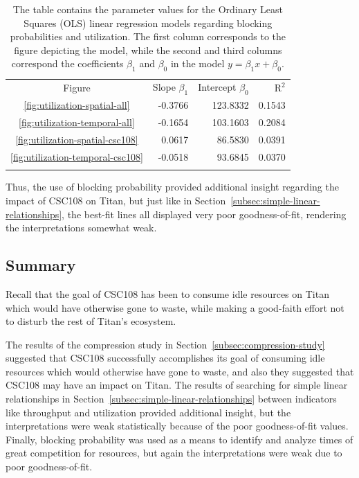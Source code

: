 \begin{table}
\caption{The table contains the parameter values for the Ordinary Least Squares
(OLS) linear regression models regarding blocking probabilities and utilization.
The first column corresponds to the figure depicting the model, while the
second and third columns correspond the coefficients $\beta_1$ and $\beta_0$ in
the model $y = \beta_{1}x + \beta_0$.}
\label{tab:blocking-utilization-params}       %
\begin{tabular}{crrr}
\hline\noalign{\smallskip}
Figure  & Slope $\beta_1$ & Intercept $\beta_0$     & $\text{R}^2$ \\
\noalign{\smallskip}\hline\noalign{\smallskip}
\ref{fig:utilization-spatial-all}       &   -0.3766 &   123.8332 & 0.1543 \\
\ref{fig:utilization-temporal-all}    &     -0.1654 &   103.1603 & 0.2084 \\
\ref{fig:utilization-spatial-csc108}  &      0.0617 &    86.5830 & 0.0391 \\
\ref{fig:utilization-temporal-csc108} &     -0.0518 &    93.6845 & 0.0370 \\
\noalign{\smallskip}\hline
\end{tabular}
\end{table}

Thus, the use of blocking probability provided additional insight regarding the
impact of CSC108 on Titan, but just like in
Section~\ref{subsec:simple-linear-relationships}, the best-fit lines all
displayed very poor goodness-of-fit, rendering the interpretations somewhat
weak.

\subsection{Summary}
\label{subsec:performance-summary}

Recall that the goal of CSC108 has been to consume idle resources on Titan
which would have otherwise gone to waste, while making a good-faith effort not
to disturb the rest of Titan's ecosystem.

The results of the compression study in Section~\ref{subsec:compression-study}
suggested that CSC108 successfully accomplishes its goal of consuming idle
resources which would otherwise have gone to waste, and also they suggested
that CSC108 may have an impact on Titan. The results of searching for simple
linear relationships in Section~\ref{subsec:simple-linear-relationships}
between indicators like throughput and utilization provided additional insight,
but the interpretations were weak statistically because of the poor
goodness-of-fit values. Finally, blocking probability was used as a means to
identify and analyze times of great competition for resources, but again the
interpretations were weak due to poor goodness-of-fit.

